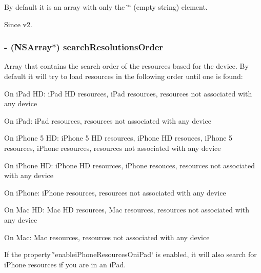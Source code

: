 By default it is an array with only the \char`\"{}\char`\"{} (empty string) element.

\begin{DoxySince}{Since}
v2. 
\end{DoxySince}
\hypertarget{class_c_c_file_utils_a1153dabbde359bd48c9cbe9f5f732931}{
\subsubsection[{search\-Resolutions\-Order}]{\setlength{\rightskip}{0pt plus 5cm}-\/ (N\-S\-Array$\ast$) {\bf search\-Resolutions\-Order}}}\label{class_c_c_file_utils_a1153dabbde359bd48c9cbe9f5f732931}
Array that contains the search order of the resources based for the device. By default it will try to load resources in the following order until one is found\-:
\begin{DoxyItemize}
\item On i\-Pad H\-D\-: i\-Pad H\-D resources, i\-Pad resources, resources not associated with any device
\item On i\-Pad\-: i\-Pad resources, resources not associated with any device
\item On i\-Phone 5 H\-D\-: i\-Phone 5 H\-D resources, i\-Phone H\-D resouces, i\-Phone 5 resources, i\-Phone resources, resources not associated with any device
\item On i\-Phone H\-D\-: i\-Phone H\-D resources, i\-Phone resouces, resources not associated with any device
\item On i\-Phone\-: i\-Phone resources, resources not associated with any device
\end{DoxyItemize}


\begin{DoxyItemize}
\item On Mac H\-D\-: Mac H\-D resources, Mac resources, resources not associated with any device
\begin{DoxyItemize}
\item On Mac\-: Mac resources, resources not associated with any device
\end{DoxyItemize}
\end{DoxyItemize}

If the property \char`\"{}enablei\-Phone\-Resources\-Oni\-Pad\char`\"{} is enabled, it will also search for i\-Phone resources if you are in an i\-Pad.


